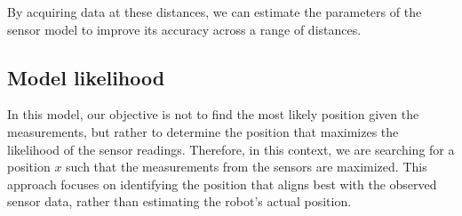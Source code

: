 By acquiring data at these distances, we can estimate the parameters of the sensor model to improve its accuracy across a range of distances.

\subsection{Model likelihood}
In this model, our objective is not to find the most likely position given the measurements, but rather to determine the position that maximizes the likelihood of the sensor readings.
Therefore, in this context, we are searching for a position $x$ such that the measurements from the sensors are maximized. 
This approach focuses on identifying the position that aligns best with the observed sensor data, rather than estimating the robot's actual position.